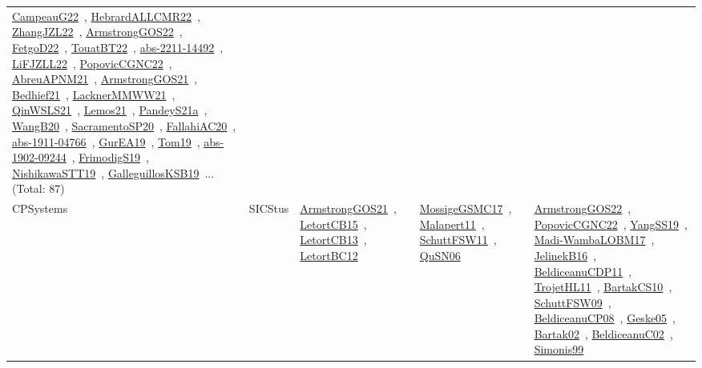 {\begin{longtable}{lp{3cm}>{\raggedright\arraybackslash}p{6cm}>{\raggedright\arraybackslash}p{6cm}>{\raggedright\arraybackslash}p{8cm}}
\href{works/CampeauG22.pdf}{CampeauG22}~\cite{CampeauG22}, \href{works/HebrardALLCMR22.pdf}{HebrardALLCMR22}~\cite{HebrardALLCMR22}, \href{works/ZhangJZL22.pdf}{ZhangJZL22}~\cite{ZhangJZL22}, \href{works/ArmstrongGOS22.pdf}{ArmstrongGOS22}~\cite{ArmstrongGOS22}, \href{works/FetgoD22.pdf}{FetgoD22}~\cite{FetgoD22}, \href{works/TouatBT22.pdf}{TouatBT22}~\cite{TouatBT22}, \href{works/abs-2211-14492.pdf}{abs-2211-14492}~\cite{abs-2211-14492}, \href{works/LiFJZLL22.pdf}{LiFJZLL22}~\cite{LiFJZLL22}, \href{works/PopovicCGNC22.pdf}{PopovicCGNC22}~\cite{PopovicCGNC22}, \href{works/AbreuAPNM21.pdf}{AbreuAPNM21}~\cite{AbreuAPNM21}, \href{works/ArmstrongGOS21.pdf}{ArmstrongGOS21}~\cite{ArmstrongGOS21}, \href{works/Bedhief21.pdf}{Bedhief21}~\cite{Bedhief21}, \href{works/LacknerMMWW21.pdf}{LacknerMMWW21}~\cite{LacknerMMWW21}, \href{works/QinWSLS21.pdf}{QinWSLS21}~\cite{QinWSLS21}, \href{works/Lemos21.pdf}{Lemos21}~\cite{Lemos21}, \href{works/PandeyS21a.pdf}{PandeyS21a}~\cite{PandeyS21a}, \href{works/WangB20.pdf}{WangB20}~\cite{WangB20}, \href{works/SacramentoSP20.pdf}{SacramentoSP20}~\cite{SacramentoSP20}, \href{works/FallahiAC20.pdf}{FallahiAC20}~\cite{FallahiAC20}, \href{works/abs-1911-04766.pdf}{abs-1911-04766}~\cite{abs-1911-04766}, \href{works/GurEA19.pdf}{GurEA19}~\cite{GurEA19}, \href{works/Tom19.pdf}{Tom19}~\cite{Tom19}, \href{works/abs-1902-09244.pdf}{abs-1902-09244}~\cite{abs-1902-09244}, \href{works/FrimodigS19.pdf}{FrimodigS19}~\cite{FrimodigS19}, \href{works/NishikawaSTT19.pdf}{NishikawaSTT19}~\cite{NishikawaSTT19}, \href{works/GalleguillosKSB19.pdf}{GalleguillosKSB19}~\cite{GalleguillosKSB19}... (Total: 87)\\
CPSystems & SICStus & \href{works/ArmstrongGOS21.pdf}{ArmstrongGOS21}~\cite{ArmstrongGOS21}, \href{works/LetortCB15.pdf}{LetortCB15}~\cite{LetortCB15}, \href{works/LetortCB13.pdf}{LetortCB13}~\cite{LetortCB13}, \href{works/LetortBC12.pdf}{LetortBC12}~\cite{LetortBC12} & \href{works/MossigeGSMC17.pdf}{MossigeGSMC17}~\cite{MossigeGSMC17}, \href{works/Malapert11.pdf}{Malapert11}~\cite{Malapert11}, \href{works/SchuttFSW11.pdf}{SchuttFSW11}~\cite{SchuttFSW11}, \href{works/QuSN06.pdf}{QuSN06}~\cite{QuSN06} & \href{works/ArmstrongGOS22.pdf}{ArmstrongGOS22}~\cite{ArmstrongGOS22}, \href{works/PopovicCGNC22.pdf}{PopovicCGNC22}~\cite{PopovicCGNC22}, \href{works/YangSS19.pdf}{YangSS19}~\cite{YangSS19}, \href{works/Madi-WambaLOBM17.pdf}{Madi-WambaLOBM17}~\cite{Madi-WambaLOBM17}, \href{works/JelinekB16.pdf}{JelinekB16}~\cite{JelinekB16}, \href{works/BeldiceanuCDP11.pdf}{BeldiceanuCDP11}~\cite{BeldiceanuCDP11}, \href{works/TrojetHL11.pdf}{TrojetHL11}~\cite{TrojetHL11}, \href{works/BartakCS10.pdf}{BartakCS10}~\cite{BartakCS10}, \href{works/SchuttFSW09.pdf}{SchuttFSW09}~\cite{SchuttFSW09}, \href{works/BeldiceanuCP08.pdf}{BeldiceanuCP08}~\cite{BeldiceanuCP08}, \href{works/Geske05.pdf}{Geske05}~\cite{Geske05}, \href{works/Bartak02.pdf}{Bartak02}~\cite{Bartak02}, \href{works/BeldiceanuC02.pdf}{BeldiceanuC02}~\cite{BeldiceanuC02}, \href{works/Simonis99.pdf}{Simonis99}~\cite{Simonis99}\\

\end{longtable}}
